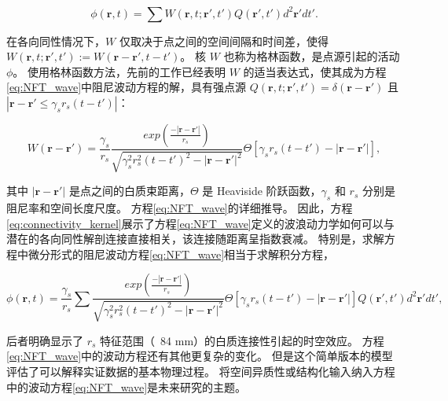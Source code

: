 \documentclass[lang=cn,a4paper,newtx,citestyle=gb7714-2015, bibstyle=gb7714-2015]{elegantpaper}
\begin{document}
\begin{equation}\label{eq:location_activity}
	\phi(\boldsymbol{r}, t) = 
		\sum
			W(\boldsymbol{r}, t; \boldsymbol{r}', t')
			Q(\boldsymbol{r}', t')
			d^2
			\boldsymbol{r}'
			dt'.
\end{equation}


在各向同性情况下，$ W $ 仅取决于点之间的空间间隔和时间差，使得 $ W(\boldsymbol{r}, t; \boldsymbol{r}', t') := W(\boldsymbol{r} - \boldsymbol{r}', t-t') $。
核 $ W $ 也称为格林函数，是点源引起的活动 $ \phi $。
使用格林函数方法\cite{pang2021stochastic}，先前的工作已经表明 $ W $ 的适当表达式，使其成为方程\ref{eq:NFT_wave}中阻尼波动方程的解，具有强点源 
$ Q(\boldsymbol{r}, t; \boldsymbol{r}', t') = \delta(\boldsymbol{r} - \boldsymbol{r}') $ 且 
$ |\boldsymbol{r} - \boldsymbol{r}' \leq \gamma_s r_s (t-t')| $：\cite{wright1995simulation,jirsa1996field,robinson1997propagation,nozari2020brain}

\begin{equation}\label{eq:connectivity_kernel}
	W(\boldsymbol{r} - \boldsymbol{r}') = 
		\frac{\gamma_s}{r_s}
		\frac{exp(\frac{-|\boldsymbol{r}-\boldsymbol{r}'|}{r_s})}{\sqrt{\gamma_s^2 r_s^2 (t-t')^2 - |\boldsymbol{r} - \boldsymbol{r}'|^2}}
		\Theta
		[\gamma_s r_s (t-t') - |\boldsymbol{r} - \boldsymbol{r}'|],
\end{equation}

其中 $ |\boldsymbol{r} - \boldsymbol{r}'| $ 是点之间的白质束距离，$ \Theta $ 是 Heaviside 阶跃函数，$ \gamma_s $ 和 $ r_s $ 分别是阻尼率和空间长度尺度。
方程\ref{eq:NFT_wave}的详细推导。 
因此，方程\ref{eq:connectivity_kernel}展示了方程\ref{eq:NFT_wave}定义的波浪动力学如何可以与潜在的各向同性解剖连接直接相关，该连接随距离呈指数衰减。
特别是，求解方程中微分形式的阻尼波动方程\ref{eq:NFT_wave}相当于求解积分方程，

\begin{equation}\label{eq:integral_equation}
	\phi(\boldsymbol{r}, t) = 
		\frac{\gamma_s}{r_s} \sum
			\frac{exp(\frac{-|\boldsymbol{r}-\boldsymbol{r}'|}{r_s})}{\sqrt{\gamma_s^2 r_s^2 (t-t')^2 - |\boldsymbol{r} - \boldsymbol{r}'|^2}}
			\Theta
			[\gamma_s r_s (t-t') - |\boldsymbol{r} - \boldsymbol{r}'|]
			Q(\boldsymbol{r}', t')
			d^2 \boldsymbol{r}'
			dt',
\end{equation}

后者明确显示了 $ r_s $ 特征范围（~84 mm\cite{robinson1997propagation}）的白质连接性引起的时空效应。
方程\ref{eq:NFT_wave}中的波动方程还有其他更复杂的变化。
但是这个简单版本的模型评估了可以解释实证数据的基本物理过程。
将空间异质性或结构化输入纳入方程中的波动方程\ref{eq:NFT_wave}是未来研究的主题。
\end{document}
